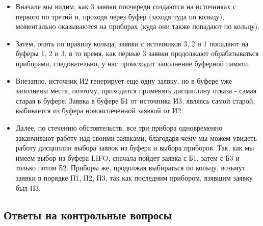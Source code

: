 \documentclass[a4paper, 14pt]{article}
\begin{document}
\begin{itemize}
	\item Вначале мы видим, как 3 заявки поочереди создаются на источниках с первого по третий и, проходя через буфер (заходя туда по кольцу), моментально оказываются на приборах (куда они также попадают по кольцу).
	\item Затем, опять по правилу кольца, заявки с источников 3, 2 и 1 попадают на буферы 1, 2 и 3, в то время, как первые 3 заявки продолжают обрабатываться приборами, следовательно, у нас происходит заполнение буферной памяти.
	\item Внезапно, источник И2 генерирует еще одну заявку, но в буфере уже заполнены места, поэтому, приходится применять дисциплину отказа - самая старая в буфере. Заявка в буфере Б1 от источника И3, являясь самой старой, выбивается из буфера новоиспеченной заявкой от И2.
	\item Далее, по стечению обстоятельств, все три прибора одновременно заканчивают работу над своими заявками, благодаря чему мы можем увидеть работу дисциплин выбора заявок из буфера и выбора приборов. Так, как мы имеем выбор из буфера LIFO, сначала пойдет заявка с Б1, затем с Б3 и только потом Б2. Приборы же, продолжая выбираться по кольцу, возьмут заявки в порядке П1, П2, П3, так как последним прибором, взявшим заявку был П3.
\end{itemize}

\newpage

\subsection{Ответы на контрольные вопросы}
\end{document}

